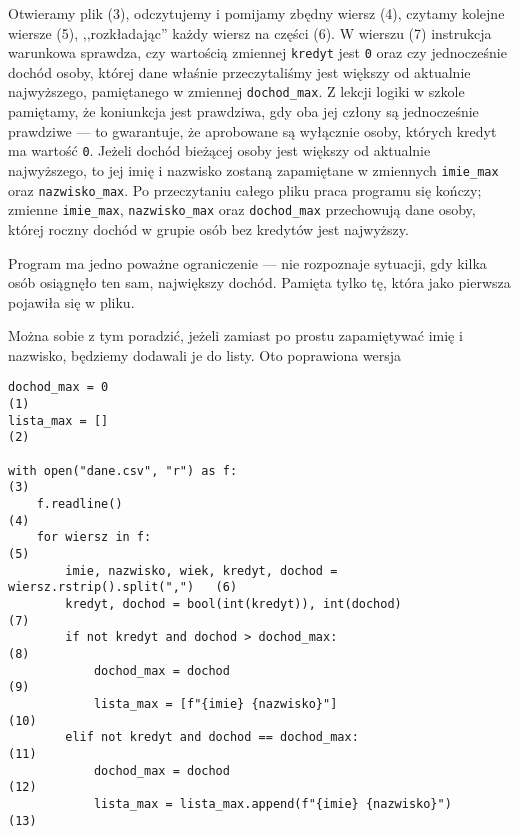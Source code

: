 \documentclass[a4paper]{article}
\begin{document}
Otwieramy plik (3), odczytujemy i pomijamy zbędny wiersz (4), czytamy kolejne wiersze (5), ,,rozkładając'' każdy wiersz na części (6). W wierszu (7) instrukcja warunkowa sprawdza, czy wartością zmiennej \texttt{kredyt} jest \texttt{0} oraz czy jednocześnie dochód osoby, której dane właśnie przeczytaliśmy jest większy od aktualnie najwyższego, pamiętanego w zmiennej \texttt{dochod\_max}. Z lekcji logiki w szkole pamiętamy, że koniunkcja jest prawdziwa, gdy oba jej człony są jednocześnie prawdziwe --- to gwarantuje, że aprobowane są wyłącznie osoby, których kredyt ma wartość \texttt{0}. Jeżeli dochód bieżącej osoby jest większy od aktualnie najwyższego, to jej imię i nazwisko zostaną zapamiętane w zmiennych \texttt{imie\_max} oraz \texttt{nazwisko\_max}. Po przeczytaniu całego pliku praca programu się kończy; zmienne \texttt{imie\_max}, \texttt{nazwisko\_max} oraz \texttt{dochod\_max} przechowują dane osoby, której roczny dochód w grupie osób bez kredytów jest najwyższy.

Program ma jedno poważne ograniczenie --- nie rozpoznaje sytuacji, gdy kilka osób osiągnęło ten sam, największy dochód. Pamięta tylko tę, która jako pierwsza pojawiła się w pliku.

Można sobie z tym poradzić, jeżeli zamiast po prostu zapamiętywać imię i nazwisko, będziemy dodawali je do listy. Oto poprawiona wersja

\begin{verbatim}
dochod_max = 0                                                              (1)
lista_max = []                                                              (2)

with open("dane.csv", "r") as f:                                            (3)
    f.readline()                                                            (4)
    for wiersz in f:                                                        (5)
        imie, nazwisko, wiek, kredyt, dochod = wiersz.rstrip().split(",")   (6)
        kredyt, dochod = bool(int(kredyt)), int(dochod)                     (7)
        if not kredyt and dochod > dochod_max:                              (8)
            dochod_max = dochod                                             (9)
            lista_max = [f"{imie} {nazwisko}"]                              (10)
        elif not kredyt and dochod == dochod_max:                           (11)
            dochod_max = dochod                                             (12)
            lista_max = lista_max.append(f"{imie} {nazwisko}")              (13)
\end{verbatim}
\end{document}
